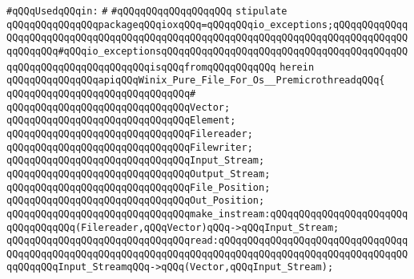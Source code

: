 \verb|#qQQqUsedqQQqin:|\newline
\verb|#|\newline
\verb|#qQQqqQQqqQQqqQQqqQQq|\newline
\newline
\verb|stipulate|\newline
\verb|qQQqqQQqqQQqqQQqpackageqQQqioxqQQq=qQQqqQQqio_exceptions;qQQqqQQqqQQqqQQqqQQqqQQqqQQqqQQqqQQqqQQqqQQqqQQqqQQqqQQqqQQqqQQqqQQqqQQqqQQqqQQqqQQqqQQqqQQq#qQQqio_exceptionsqQQqqQQqqQQqqQQqqQQqqQQqqQQqqQQqqQQqqQQqqQQqqQQqqQQqqQQqqQQqqQQqqQQqisqQQqfromqQQqqQQqqQQq|\newline
\verb|herein|\newline
\newline
\verb|qQQqqQQqqQQqqQQqapiqQQqWinix_Pure_File_For_Os__PremicrothreadqQQq{|\newline
\verb|qQQqqQQqqQQqqQQqqQQqqQQqqQQqqQQq#|\newline
\verb|qQQqqQQqqQQqqQQqqQQqqQQqqQQqqQQqVector;|\newline
\verb|qQQqqQQqqQQqqQQqqQQqqQQqqQQqqQQqElement;|\newline
\newline
\verb|qQQqqQQqqQQqqQQqqQQqqQQqqQQqqQQqFilereader;|\newline
\verb|qQQqqQQqqQQqqQQqqQQqqQQqqQQqqQQqFilewriter;|\newline
\newline
\verb|qQQqqQQqqQQqqQQqqQQqqQQqqQQqqQQqInput_Stream;|\newline
\verb|qQQqqQQqqQQqqQQqqQQqqQQqqQQqqQQqOutput_Stream;|\newline
\newline
\verb|qQQqqQQqqQQqqQQqqQQqqQQqqQQqqQQqFile_Position;|\newline
\verb|qQQqqQQqqQQqqQQqqQQqqQQqqQQqqQQqOut_Position;|\newline
\newline
\verb|qQQqqQQqqQQqqQQqqQQqqQQqqQQqqQQqmake_instream:qQQqqQQqqQQqqQQqqQQqqQQqqQQqqQQqqQQq(Filereader,qQQqVector)qQQq->qQQqInput_Stream;|\newline
\newline
\verb|qQQqqQQqqQQqqQQqqQQqqQQqqQQqqQQqread:qQQqqQQqqQQqqQQqqQQqqQQqqQQqqQQqqQQqqQQqqQQqqQQqqQQqqQQqqQQqqQQqqQQqqQQqqQQqqQQqqQQqqQQqqQQqqQQqqQQqqQQqqQQqqQQqInput_StreamqQQq->qQQq(Vector,qQQqInput_Stream);|\newline
